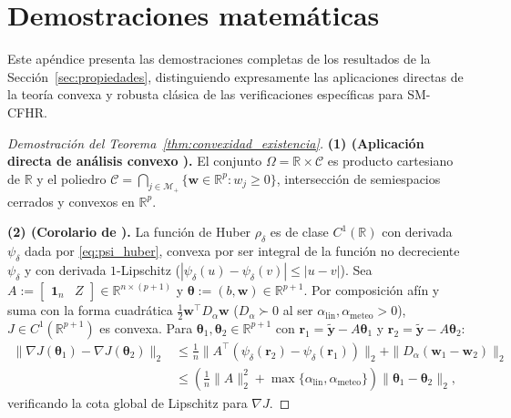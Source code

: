 \section{Demostraciones matemáticas}\label{ap:demos}

Este apéndice presenta las demostraciones completas de los resultados de la Sección~\ref{sec:propiedades}, distinguiendo expresamente las aplicaciones directas de la teoría convexa y robusta clásica \cite{boyd2004convex,huber1964,hampel1986robust,huber2009robust} de las verificaciones específicas para SM-CFHR.

\begin{proof}[Demostración del Teorema~\ref{thm:convexidad_existencia}]
\textbf{(1) (Aplicación directa de análisis convexo \cite{boyd2004convex}).} El conjunto $\Omega = \mathbb{R} \times \mathcal{C}$ es producto cartesiano de $\mathbb{R}$ y el poliedro $\mathcal{C} = \bigcap_{j \in \mathcal{M}_+} \{\mathbf{w} \in \mathbb{R}^p : w_j \ge 0\}$, intersección de semiespacios cerrados y convexos en $\mathbb{R}^p$.

\textbf{(2) (Corolario de \cite{huber1964,boyd2004convex}).} La función de Huber $\rho_\delta$ es de clase $C^1(\mathbb{R})$ con derivada $\psi_\delta$ dada por \eqref{eq:psi_huber}, convexa por ser integral de la función no decreciente $\psi_\delta$ y con derivada $1$-Lipschitz ($|\psi_\delta(u) - \psi_\delta(v)| \le |u - v|$). Sea $A := \begin{bmatrix} \mathbf{1}_n & Z \end{bmatrix} \in \mathbb{R}^{n \times (p+1)}$ y $\boldsymbol{\theta} := (b, \mathbf{w}) \in \mathbb{R}^{p+1}$. Por composición afín y suma con la forma cuadrática $\frac{1}{2}\mathbf{w}^\top D_\alpha \mathbf{w}$ ($D_\alpha \succ 0$ al ser $\alpha_{\mathrm{lin}}, \alpha_{\mathrm{meteo}} > 0$), $J \in C^1(\mathbb{R}^{p+1})$ es convexa. Para $\boldsymbol{\theta}_1, \boldsymbol{\theta}_2 \in \mathbb{R}^{p+1}$ con $\mathbf{r}_1 = \tilde{\mathbf{y}} - A\boldsymbol{\theta}_1$ y $\mathbf{r}_2 = \tilde{\mathbf{y}} - A\boldsymbol{\theta}_2$:
\begin{align*}
\|\nabla J(\boldsymbol{\theta}_1) - \nabla J(\boldsymbol{\theta}_2)\|_2
&\le \frac{1}{n}\|A^\top (\psi_\delta(\mathbf{r}_2) - \psi_\delta(\mathbf{r}_1))\|_2 + \|D_\alpha(\mathbf{w}_1 - \mathbf{w}_2)\|_2 \\
&\le \left(\frac{1}{n}\|A\|_2^2 + \max\{\alpha_{\mathrm{lin}}, \alpha_{\mathrm{meteo}}\}\right)\|\boldsymbol{\theta}_1 - \boldsymbol{\theta}_2\|_2,
\end{align*}
verificando la cota global de Lipschitz para $\nabla J$.


\end{proof}
